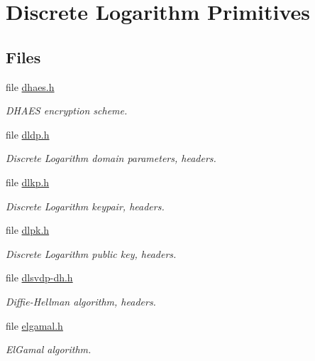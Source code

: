 \hypertarget{group__DL__m}{
\section{Discrete Logarithm Primitives}
\label{group__DL__m}
}
\subsection*{Files}
\begin{CompactItemize}
\item 
file \hyperlink{dhaes_8h}{dhaes.h}
\begin{CompactList}\small\item\em DHAES encryption scheme. \item\end{CompactList}

\item 
file \hyperlink{dldp_8h}{dldp.h}
\begin{CompactList}\small\item\em Discrete Logarithm domain parameters, headers. \item\end{CompactList}

\item 
file \hyperlink{dlkp_8h}{dlkp.h}
\begin{CompactList}\small\item\em Discrete Logarithm keypair, headers. \item\end{CompactList}

\item 
file \hyperlink{dlpk_8h}{dlpk.h}
\begin{CompactList}\small\item\em Discrete Logarithm public key, headers. \item\end{CompactList}

\item 
file \hyperlink{dlsvdp-dh_8h}{dlsvdp-dh.h}
\begin{CompactList}\small\item\em Diffie-Hellman algorithm, headers. \item\end{CompactList}

\item 
file \hyperlink{elgamal_8h}{elgamal.h}
\begin{CompactList}\small\item\em El\-Gamal algorithm. \item\end{CompactList}

\end{CompactItemize}
